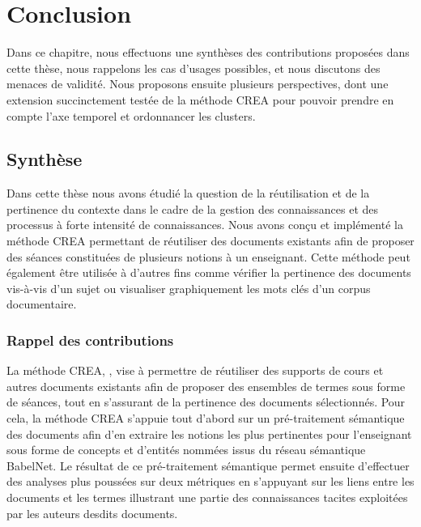\chapter{Conclusion}
\label{chapter:Conclusion}

Dans ce chapitre, nous effectuons une synthèses des contributions proposées dans cette thèse, nous rappelons les cas d'usages possibles, et nous discutons des menaces de validité.
Nous proposons ensuite plusieurs perspectives, dont une extension succinctement testée de la méthode CREA pour pouvoir prendre en compte l'axe temporel et ordonnancer les clusters.


\bigskip

\minitoc %

\newpage


\section{Synthèse}
\label{section:Conclusion:Synthese}

Dans cette thèse nous avons étudié la question de la réutilisation et de la pertinence du contexte dans le cadre de la gestion des connaissances et des processus à forte intensité de connaissances.
Nous avons conçu et implémenté la méthode CREA permettant de réutiliser des documents existants afin de proposer des séances constituées de plusieurs notions à un enseignant.
Cette méthode peut également être utilisée à d'autres fins comme vérifier la pertinence des documents vis-à-vis d'un sujet ou visualiser graphiquement les mots clés d'un corpus documentaire.


\subsection{Rappel des contributions}
\label{subsection:Conclusion:Synthese:RappelContributions}

La méthode CREA, \MyCREA, vise à permettre de réutiliser des supports de cours et autres documents existants afin de proposer des ensembles de termes sous forme de séances, tout en s'assurant de la pertinence des documents sélectionnés.
Pour cela, la méthode CREA s'appuie tout d'abord sur un pré-traitement sémantique des documents afin d'en extraire les notions les plus pertinentes pour l'enseignant sous forme de concepts et d'entités nommées issus du réseau sémantique BabelNet.
Le résultat de ce pré-traitement sémantique permet ensuite d'effectuer des analyses plus poussées sur deux métriques en s'appuyant sur les liens entre les documents et les termes illustrant une partie des connaissances tacites exploitées par les auteurs desdits documents.

